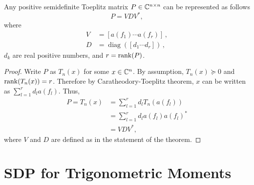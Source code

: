 \begin{corollary}\label{lm:vand} Any positive semidefinite Toeplitz matrix $P \in \mathbb{C}^{n \times n}$ can be represented as
  follows
  \[
    P  =  V D V^*,
  \]
  where
  \[
  \begin{aligned}
    V & = \left[ {a} \left( f_1 \right) \cdots
    {a} \left( f_r \right) \right]\,,\\
    D & = \operatorname{diag} \left( \left[ d_1 \cdots d_r \right] \right)\,,
  \end{aligned}
  \]
 $d_k$ are real positive numbers, and $r = \operatorname{rank}(P)$.
\end{corollary}
\begin{proof}
Write $P$ as $T_n(x)$ for some $x \in \mathbb{C}^n$. By assumption, $T_n(x) \succeq 0$ and $\operatorname{rank}(T_n(x)) = r $. Therefore by Caratheodory-Toeplitz theorem, $x$ can be written as $\sum_{l=1}^r{d_l a(f_l)}$. Thus, 
\begin{align*}
	P = T_n(x) &= \sum_{l=1}^r{d_l T_n(a(f_l))}\\
	&=\sum_{l=1}^r{d_l a(f_l) a(f_l)^*}\\
	& = V D V^*,
\end{align*}
where $V$ and $D$ are defined as in the statement of the theorem.
\end{proof}


% 
% 

\section{SDP for Trigonometric Moments} %
\label{sec:sdp_for_trigonometric_moments}



